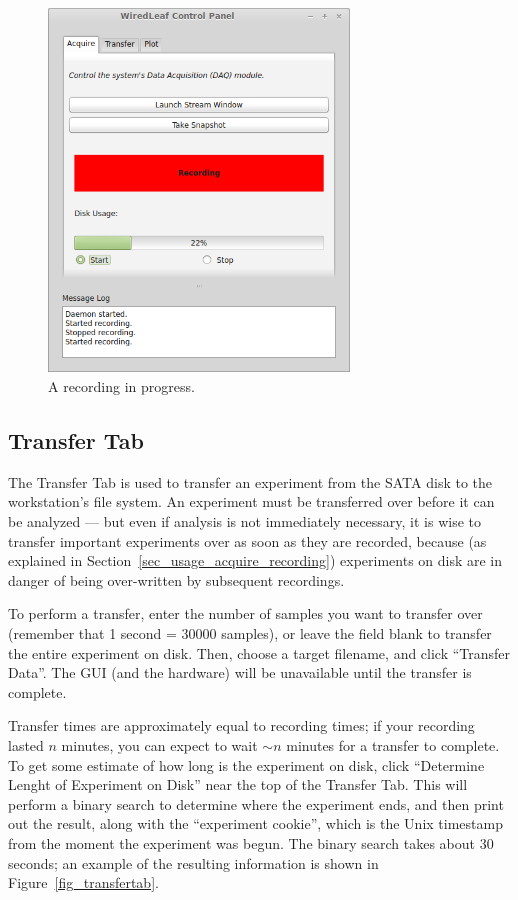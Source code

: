 \begin{figure}[h!]
\begin{center}
\includegraphics[width=8cm]{screenshots/recording.png}
\end{center}
\caption{A recording in progress.}
\label{fig_recording}
\end{figure}

\subsection{Transfer Tab}
\label{sec_usage_transfer}

The Transfer Tab is used to transfer an experiment from the SATA disk to the workstation's file system. An experiment must be transferred over before it can be analyzed --- but even if analysis is not immediately necessary, it is wise to transfer important experiments over as soon as they are recorded, because (as explained in Section~\ref{sec_usage_acquire_recording}) experiments on disk are in danger of being over-written by subsequent recordings.

To perform a transfer, enter the number of samples you want to transfer over (remember that 1 second = 30000 samples), or leave the field blank to transfer the entire experiment on disk. Then, choose a target filename, and click ``Transfer Data''. The GUI (and the hardware) will be unavailable until the transfer is complete.

Transfer times are approximately equal to recording times; if your recording lasted $n$ minutes, you can expect to wait $\sim n$ minutes for a transfer to complete. To get some estimate of how long is the experiment on disk, click ``Determine Lenght of Experiment on Disk'' near the top of the Transfer Tab. This will perform a binary search to determine where the experiment ends, and then print out the result, along with the ``experiment cookie'', which is the Unix timestamp from the moment the experiment was begun. The binary search takes about 30 seconds; an example of the resulting information is shown in Figure~\ref{fig_transfertab}.

